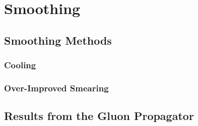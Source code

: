 
\chapter{Smoothing}
\section{Smoothing Methods}
\subsection{Cooling}
\subsection{Over-Improved Smearing}

\section{Results from the Gluon Propagator}

\ifpdf
    \graphicspath{{Chapter5/Figs/Raster/}{Chapter5/Figs/PDF/}{Chapter5/Figs/}}
\else
    \graphicspath{{Chapter5/Figs/Vector/}{Chapter5/Figs/}}
\fi
